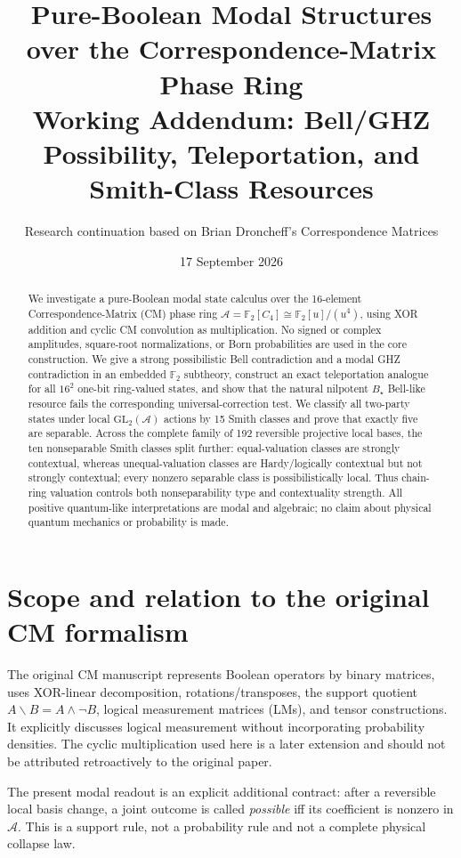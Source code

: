 \documentclass[11pt]{article}
\title{Pure-Boolean Modal Structures over the Correspondence-Matrix Phase Ring\\
\large Working Addendum: Bell/GHZ Possibility, Teleportation, and Smith-Class Resources}
\author{Research continuation based on Brian Droncheff's Correspondence Matrices}
\date{17 September 2026}
\newcommand{\A}{\mathcal A}
\newcommand{\F}{\mathbb F}
\begin{document}
\maketitle

\begin{abstract}
We investigate a pure-Boolean modal state calculus over the 16-element
Correspondence-Matrix (CM) phase ring
$\A=\F_2[C_4]\cong\F_2[u]/(u^4)$, using XOR addition and cyclic CM
convolution as multiplication.  No signed or complex amplitudes, square-root
normalizations, or Born probabilities are used in the core construction.
We give a strong possibilistic Bell contradiction and a modal GHZ
contradiction in an embedded $\F_2$ subtheory, construct an exact
teleportation analogue for all $16^2$ one-bit ring-valued states, and show
that the natural nilpotent $B_\star$ Bell-like resource fails the corresponding
universal-correction test.  We classify all two-party states under local
$\mathrm{GL}_2(\A)$ actions by 15 Smith classes and prove that exactly five are
separable.  Across the complete family of 192 reversible projective local
bases, the ten nonseparable Smith classes split further: equal-valuation
classes are strongly contextual, whereas unequal-valuation classes are
Hardy/logically contextual but not strongly contextual; every nonzero
separable class is possibilistically local.  Thus chain-ring valuation controls
both nonseparability type and contextuality strength.  All positive
quantum-like interpretations are modal and algebraic; no claim about physical
quantum mechanics or probability is made.
\end{abstract}

\section{Scope and relation to the original CM formalism}

The original CM manuscript represents Boolean operators by binary matrices,
uses XOR-linear decomposition, rotations/transposes, the support quotient
$A\backslash B=A\wedge\neg B$, logical measurement matrices (LMs), and tensor
constructions.  It explicitly discusses logical measurement without
incorporating probability densities.  The cyclic multiplication used here is
a later extension and should not be attributed retroactively to the original
paper.

The present modal readout is an explicit additional contract: after a
reversible local basis change, a joint outcome is called \emph{possible} iff
its coefficient is nonzero in $\A$.  This is a support rule, not a probability
rule and not a complete physical collapse law.
\end{document}
